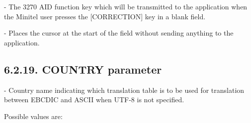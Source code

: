 \documentclass[letterpaper,10pt,english]{sphinxmanual}
\begin{document}
 - The 3270 AID function key which will be transmitted to the application when the Minitel user presses the {[}CORRECTION{]} key in a blank field.

 - Places the cursor at the start of the field without sending anything to the application.


\subsection{6.2.19. COUNTRY parameter}
\label{\detokenize{Installation_Guide:country-parameter}}
\begin{sphinxVerbatim}[commandchars=\\\{\}]
 
\end{sphinxVerbatim}

 - Country name indicating which translation table is to be used for translation between EBCDIC and ASCII when UTF-8 is not specified.

Possible values are:
\end{document}

